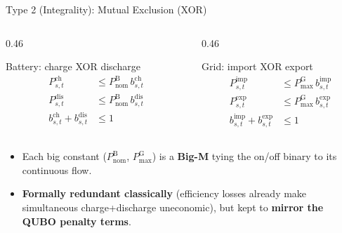 \documentclass[aspectratio=169]{beamer}
\begin{document}
\begin{frame}{Type 2 (Integrality): Mutual Exclusion (XOR)}
\begin{columns}[t]
\begin{column}{0.46\textwidth}
\begin{block}{Battery: charge XOR discharge}
\[
\begin{aligned}
P^{\text{ch}}_{s,t}  &\le P^{\text{B}}_{\text{nom}}\,b^{\text{ch}}_{s,t}\\
P^{\text{dis}}_{s,t} &\le P^{\text{B}}_{\text{nom}}\,b^{\text{dis}}_{s,t}\\
b^{\text{ch}}_{s,t} + b^{\text{dis}}_{s,t} &\le 1
\end{aligned}
\]
\end{block}
\end{column}
\hspace{0.04\textwidth}
\begin{column}{0.46\textwidth}
\begin{block}{Grid: import XOR export}
\[
\begin{aligned}
P^{\text{imp}}_{s,t} &\le P^{\text{G}}_{\max}\,b^{\text{imp}}_{s,t}\\
P^{\text{exp}}_{s,t} &\le P^{\text{G}}_{\max}\,b^{\text{exp}}_{s,t}\\
b^{\text{imp}}_{s,t} + b^{\text{exp}}_{s,t} &\le 1
\end{aligned}
\]
\end{block}
\end{column}
\end{columns}
\vspace{0.2cm}
\begin{itemize}\footnotesize
    \item Each big constant ($P^{\text{B}}_{\text{nom}}$, $P^{\text{G}}_{\max}$) is a
          \textbf{Big-M} tying the on/off binary to its continuous flow.
    \item \textbf{Formally redundant classically} (efficiency losses already make
          simultaneous charge+discharge uneconomic), but kept to \textbf{mirror the
          QUBO penalty terms}.
\end{itemize}
\end{frame}
\end{document}
